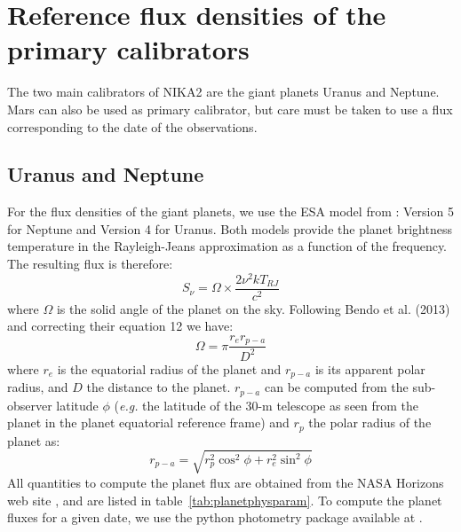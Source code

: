 %
%


\section{Reference flux densities of the primary calibrators }%
\label{se:ref_flux_primaries}

The two main calibrators of NIKA2 are the giant planets Uranus and
Neptune. Mars can also be used as primary calibrator, but care must be
taken to use a flux corresponding to the date of the observations.  

\subsection{Uranus and Neptune}
\label{se:ref_flux_uranus_neptune}
For the flux densities of the giant planets, we use the ESA model from
\cite{ESAmodel}: Version 5 for Neptune and Version 4 for Uranus. 
Both models provide the planet brightness temperature in the
Rayleigh-Jeans approximation as a function of the frequency. The
resulting flux is therefore: 
\begin{equation}
S_{\nu} = \Omega \times \frac{2 \nu^{2} k T_{RJ}}{c^2}
\end{equation}
where $\Omega$ is the solid angle of the planet on the sky. Following
Bendo et al. (2013) and correcting their equation 12 we have:
\begin{equation}
\Omega = \pi \frac{r_{e} r_{p-a}}{D^{2}} 
\label{eq:omega}
\end{equation}
where $r_{e}$ is the equatorial radius of the planet and $r_{p-a}$ is
its apparent polar radius, and $D$ the distance to the
planet. $r_{p-a}$ can be computed from the sub-observer latitude $\phi$
({\it e.g.} the latitude of the 30-m telescope as seen from the planet in the
planet equatorial reference frame) and $r_{p}$ the polar radius of the
planet as:
\begin{equation}
r_{p-a} = \sqrt{r_{p}^2 \cos^{2}\phi + r_{e}^2 \sin^{2} \phi}
\end{equation}
All quantities to compute the planet flux are obtained from the NASA
Horizons web site \cite{NASAHorizon}, and are
listed in table~\ref{tab:planetphysparam}. To compute the planet fluxes for a given date, we use the python
photometry package available at \cite{gith-Haussel}.

